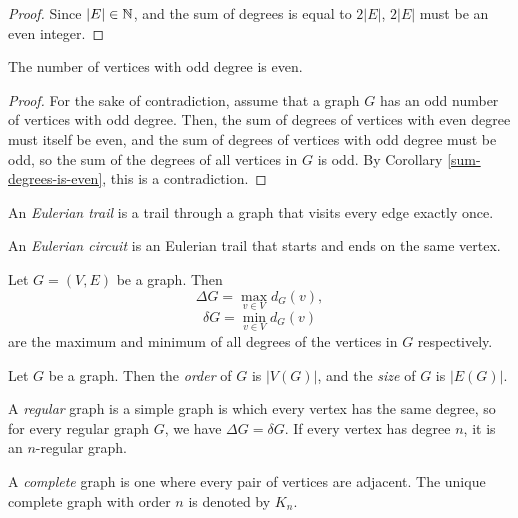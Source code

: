 \begin{proof}
    Since $|E| \in \mathbb{N}$, and the sum of degrees is equal to $2|E|$, $2|E|$ must be an even integer.
\end{proof}

\begin{cor}\label{n-of-odd-vertices-is-even}
    The number of vertices with odd degree is even.
\end{cor}

\begin{proof}
    For the sake of contradiction, assume that a graph $G$ has an odd number of vertices with odd degree. Then, the sum of degrees of vertices with even degree must itself be even, and the sum of degrees of vertices with odd degree must be odd, so the sum of the degrees of all vertices in $G$ is odd. By Corollary \ref{sum-degrees-is-even}, this is a contradiction.
\end{proof}

\begin{defn}
    An \emph{Eulerian trail} is a trail through a graph that visits every edge exactly once.
\end{defn}

\begin{defn}
    An \emph{Eulerian circuit} is an Eulerian trail that starts and ends on the same vertex.
\end{defn}

\begin{defn}
    Let $G = (V, E)$ be a graph. Then
    \[\Delta G = \max_{v \in V}d_G(v),\]
    \[\delta G = \min_{v \in V}d_G(v)\] are the maximum and minimum of all degrees of the vertices in $G$ respectively.
\end{defn}

\begin{defn}
    Let $G$ be a graph. Then the \emph{order} of $G$ is $|V(G)|$, and the \emph{size} of $G$ is $|E(G)|$.
\end{defn}

\begin{defn}
    A \emph{regular} graph is a simple graph is which every vertex has the same degree, so for every regular graph $G$, we have $\Delta G = \delta G$. If every vertex has degree $n$, it is an $n$-regular graph.
\end{defn}

\begin{defn}
    A \emph{complete} graph is one where every pair of vertices are adjacent. The unique complete graph with order $n$ is denoted by $K_n$.
\end{defn}

